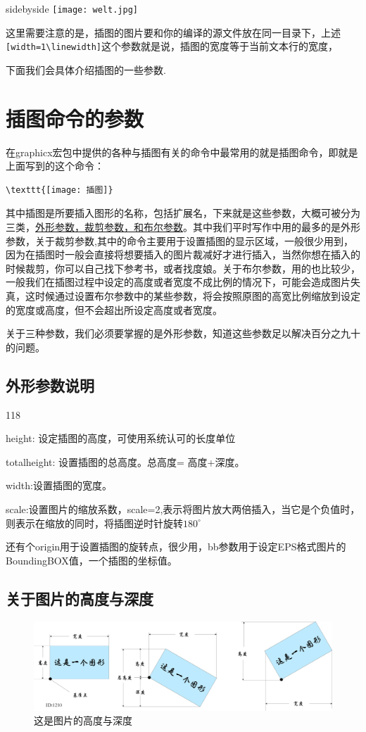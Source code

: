 \documentclass[cn,chinese,color=cyan]{elegantbook}
\begin{document}
\begin{tcblisting}{sidebyside}
\texttt{[image: welt.jpg]}
\end{tcblisting}
\begin{note}
这里需要注意的是，插图的图片要和你的编译的源文件放在同一目录下，上述\verb|[width=1\linewidth]|这个参数就是说，插图的宽度等于当前文本行的宽度，
\end{note}
下面我们会具体介绍插图的一些参数.
\section{插图命令的参数}
在graphicx宏包中提供的各种与插图有关的命令中最常用的就是插图命令，即就是上面写到的这个命令：
\begin{lstlisting}[style=R]
\texttt{[image: 插图]}
\end{lstlisting}

其中插图是所要插入图形的名称，包括扩展名，下来就是这些参数，大概可被分为三类，\underline{外形参数，裁剪参数，和布尔参数}。其中我们平时写作中用的最多的是外形参数，关于裁剪参数,其中的命令主要用于设置插图的显示区域，一般很少用到，因为在插图时一般会直接将想要插入的图片裁减好才进行插入，当然你想在插入的时候裁剪，你可以自己找下参考书，或者找度娘。关于布尔参数，用的也比较少，一般我们在插图过程中设定的高度或者宽度不成比例的情况下，可能会造成图片失真，这时候通过设置布尔参数中的某些参数，将会按照原图的高宽比例缩放到设定的宽度或高度，但不会超出所设定高度或者宽度。
\begin{note}
关于三种参数，我们必须要掌握的是外形参数，知道这些参数足以解决百分之九十的问题。
\end{note}
\subsection{外形参数说明}
\begin{dinglist}{118}
	\item height: 设定插图的高度，可使用系统认可的长度单位
	\item totalheight: 设置插图的总高度。总高度= 高度+深度。
	\item width:设置插图的宽度。
	\item scale:设置图片的缩放系数，scale=2,表示将图片放大两倍插入，当它是个负值时，则表示在缩放的同时，将插图逆时针旋转$180^{\circ}$
	\item 还有个origin用于设置插图的旋转点，很少用，bb参数用于设定EPS格式图片的BoundingBOX值，一个插图的坐标值。
\end{dinglist}


\subsection{关于图片的高度与深度}
\begin{figure}[H]
	\centering
	\includegraphics[width=0.8\linewidth]{figure/11843}
	\caption{这是图片的高度与深度}
\end{figure}
\end{document}
